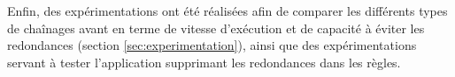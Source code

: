 \par Enfin, des expérimentations ont été réalisées afin de comparer les différents types de chaînages avant en terme de vitesse d'exécution et de capacité à éviter les redondances (section \ref{sec:experimentation}), ainsi que des expérimentations servant à tester l'application supprimant les redondances dans les règles.

